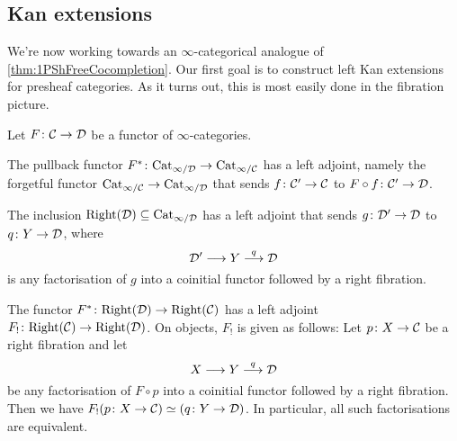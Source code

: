 \subsection{Kan extensions}\label{subsec:KanExtensions}
We're now working towards an $\infty$-categorical analogue of \cref{thm:1PShFreeCocompletion}. %
Our first goal is to construct left Kan extensions for presheaf categories. As it turns out, this is most easily done in the fibration picture.
\begin{lem}\label{lem:KanExtensionForRight}
	Let $F\colon \mathcal{C}\rightarrow \mathcal{D}$ be a functor of $\infty$-categories.
	\begin{alphanumerate}
		\item \!The pullback functor $F^*\colon \mathrm{Cat}_{\infty/\mathcal{D}}\rightarrow\mathrm{Cat}_{\infty/\mathcal{C}}$ has a left adjoint, namely the forgetful functor $\mathrm{Cat}_{\infty/\mathcal{C}}\rightarrow\mathrm{Cat}_{\infty/\mathcal{D}}$ that sends $f\colon \mathcal{C}'\rightarrow \mathcal{C}$ to $F\circ f\colon \mathcal{C}'\rightarrow \mathcal{D}$.\label{enum:ForgetfulFunctor}
		\item \!The inclusion $\mathrm{Right}(\mathcal{D})\subseteq\mathrm{Cat}_{\infty/\mathcal{D}}$ has a left adjoint that sends $g\colon \mathcal{D}'\rightarrow \mathcal{D}$ to $q\colon Y\rightarrow \mathcal{D}$, where
		\begin{equation*}
			\mathcal{D}'\longrightarrow Y\overset{q}{\longrightarrow}\mathcal{D}
		\end{equation*}
		is any factorisation of $g$ into a coinitial functor followed by a right fibration.\label{enum:RightCofinalLeftAdjoint}
		\item \!The functor $F^*\colon \mathrm{Right}(\mathcal{D})\rightarrow \mathrm{Right}(\mathcal{C})$ has a left adjoint $F_!\colon \mathrm{Right}(\mathcal{C})\rightarrow \mathrm{Right}(\mathcal{D})$. On objects, $F_!$ is given as follows: Let $p\colon X\rightarrow \mathcal{C}$ be a right fibration and let\label{enum:RightPullbackLeftAdjoint}
		\begin{equation*}
			X\longrightarrow Y\overset{q}{\longrightarrow} \mathcal{D}
		\end{equation*}
		be any factorisation of $F\circ p$ into a coinitial functor followed by a right fibration. Then we have $F_!(p\colon X\rightarrow \mathcal{C})\simeq (q\colon Y\rightarrow \mathcal{D})$. In particular, all such factorisations are equivalent.
	\end{alphanumerate}
\end{lem}
